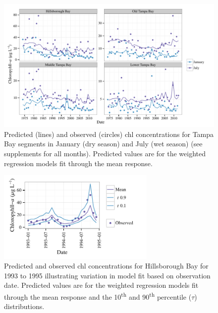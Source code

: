 \documentclass{svjour3}\usepackage[]{graphicx}\usepackage[]{color}
\begin{document}
\begin{figure}[!ht]


{\centering \includegraphics[width=6in]{figspredobs} 

}

\caption[Predicted (lines) and observed (circles) \ac{chl} concentrations for Tampa Bay segments in January (dry season) and July (wet season) (see supplements for all months)]{Predicted (lines) and observed (circles) \ac{chl} concentrations for Tampa Bay segments in January (dry season) and July (wet season) (see supplements for all months).  Predicted values are for the weighted regression models fit through the mean response.\label{fig:predobs}}
\end{figure}



\begin{figure}[!ht]


{\centering \includegraphics[width=3in]{figshbslice} 

}

\caption[Predicted and observed \ac{chl} concentrations for Hillsborough Bay for 1993 to 1995 illustrating variation in model fit based on observation date]{Predicted and observed \ac{chl} concentrations for Hillsborough Bay for 1993 to 1995 illustrating variation in model fit based on observation date. Predicted values are for the weighted regression models fit through the mean response and the 10\textsuperscript{th} and 90\textsuperscript{th} percentile ($\tau$) distributions.\label{fig:hbslice}}
\end{figure}
\end{document}

